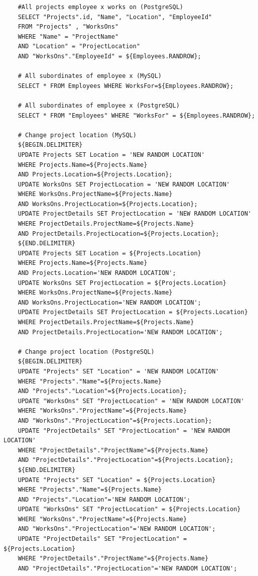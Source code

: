 \documentclass[12pt]{article}
\begin{document}
\begin{spacing}{1.9}
\begin{verbatim}
	#All projects employee x works on (PostgreSQL)
	SELECT "Projects".id, "Name", "Location", "EmployeeId"
	FROM "Projects" , "WorksOns"
	WHERE "Name" = "ProjectName"
	AND "Location" = "ProjectLocation"
	AND "WorksOns"."EmployeeId" = ${Employees.RANDROW};
	
	# All subordinates of employee x (MySQL)
	SELECT * FROM Employees WHERE WorksFor=${Employees.RANDROW};
	
	# All subordinates of employee x (PostgreSQL)
	SELECT * FROM "Employees" WHERE "WorksFor" = ${Employees.RANDROW};
	
	# Change project location (MySQL)
	${BEGIN.DELIMITER}
	UPDATE Projects SET Location = 'NEW RANDOM LOCATION' 
	WHERE Projects.Name=${Projects.Name} 
	AND Projects.Location=${Projects.Location};
	UPDATE WorksOns SET ProjectLocation = 'NEW RANDOM LOCATION' 
	WHERE WorksOns.ProjectName=${Projects.Name} 
	AND WorksOns.ProjectLocation=${Projects.Location};
	UPDATE ProjectDetails SET ProjectLocation = 'NEW RANDOM LOCATION' 
	WHERE ProjectDetails.ProjectName=${Projects.Name} 
	AND ProjectDetails.ProjectLocation=${Projects.Location};
	${END.DELIMITER}
	UPDATE Projects SET Location = ${Projects.Location} 
	WHERE Projects.Name=${Projects.Name} 
	AND Projects.Location='NEW RANDOM LOCATION';
	UPDATE WorksOns SET ProjectLocation = ${Projects.Location} 
	WHERE WorksOns.ProjectName=${Projects.Name} 
	AND WorksOns.ProjectLocation='NEW RANDOM LOCATION';
	UPDATE ProjectDetails SET ProjectLocation = ${Projects.Location} 
	WHERE ProjectDetails.ProjectName=${Projects.Name} 
	AND ProjectDetails.ProjectLocation='NEW RANDOM LOCATION';
	
	# Change project location (PostgreSQL)
	${BEGIN.DELIMITER}
	UPDATE "Projects" SET "Location" = 'NEW RANDOM LOCATION'
	WHERE "Projects"."Name"=${Projects.Name} 
	AND "Projects"."Location"=${Projects.Location};
	UPDATE "WorksOns" SET "ProjectLocation" = 'NEW RANDOM LOCATION'
	WHERE "WorksOns"."ProjectName"=${Projects.Name} 
	AND "WorksOns"."ProjectLocation"=${Projects.Location};
	UPDATE "ProjectDetails" SET "ProjectLocation" = 'NEW RANDOM LOCATION' 
	WHERE "ProjectDetails"."ProjectName"=${Projects.Name}
	AND "ProjectDetails"."ProjectLocation"=${Projects.Location};
	${END.DELIMITER}
	UPDATE "Projects" SET "Location" = ${Projects.Location}
	WHERE "Projects"."Name"=${Projects.Name} 
	AND "Projects"."Location"='NEW RANDOM LOCATION';
	UPDATE "WorksOns" SET "ProjectLocation" = ${Projects.Location}
	WHERE "WorksOns"."ProjectName"=${Projects.Name} 
	AND "WorksOns"."ProjectLocation"='NEW RANDOM LOCATION';
	UPDATE "ProjectDetails" SET "ProjectLocation" = ${Projects.Location}
	WHERE "ProjectDetails"."ProjectName"=${Projects.Name}
	AND "ProjectDetails"."ProjectLocation"='NEW RANDOM LOCATION';
	

\end{verbatim}
\end{spacing}
\end{document}
